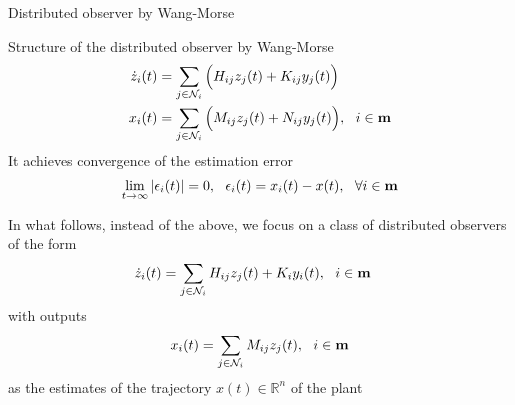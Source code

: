 \documentclass{beamer}
\newcommand{\R}{\mathbb{R}}
\begin{document}
\begin{frame}{\color{blue} Distributed observer by Wang-Morse}

Structure of the distributed observer by Wang-Morse
\begin{align*}
\dot{z}_{i}(t)&=\sum_{j\in\mathcal{N}_{i}} \Big( H_{ij}z_{j}(t) + K_{ij}y_{j}(t) \Big) \\
x_{i}(t)&=\sum_{j\in\mathcal{N}_{i}} \Big( M_{ij}z_{j}(t) + N_{ij}y_{j}(t) \Big),~~ i\in{\bf m}
\end{align*}
It achieves convergence of the estimation error
\begin{equation*}
\lim_{t\rightarrow\infty} |\epsilon_{i}(t)|=0,~~ \epsilon_{i}(t)=x_{i}(t)-x(t),~~ \forall i\in{\bf m}
\end{equation*}
\end{frame}


\begin{frame}{\color{blue} }

In what follows, instead of the above, we focus on a class of distributed observers of the form
\begin{align*}
\dot{z}_{i}(t)&=\sum_{j\in\mathcal{N}_{i}} H_{ij}z_{j}(t) + K_{i}y_{i}(t),~~ i\in{\bf m}
\end{align*}
with outputs
\begin{equation*}
x_{i}(t)=\sum_{j\in\mathcal{N}_{i}} M_{ij}z_{j}(t),~~ i\in{\bf m}
\end{equation*}
as the estimates of the trajectory $x(t)\in\R^{n}$ of the plant

\end{frame}
\end{document}
